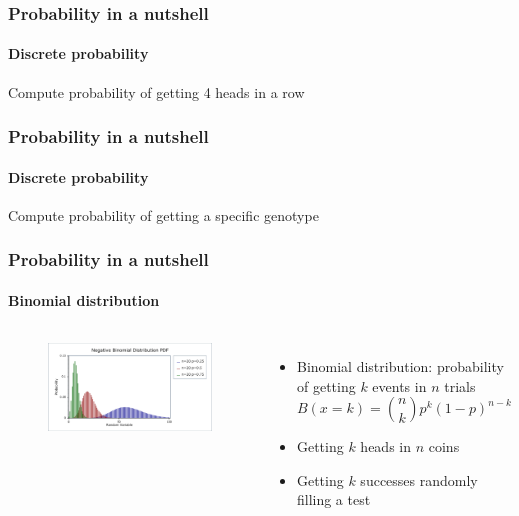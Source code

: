 \documentclass[aspectratio=43]{beamer}
\begin{document}
\begin{frame}

	\frametitle{Probability in a nutshell}
	\framesubtitle{Discrete probability}
	
	\footnotesize
	
	Compute probability of getting 4 heads in a row

\end{frame}

\begin{frame}
	
	\frametitle{Probability in a nutshell}
	\framesubtitle{Discrete probability}
	
	\footnotesize
	
	Compute probability of getting a specific genotype

\end{frame}

\begin{frame}
	
	\frametitle{Probability in a nutshell}
	\framesubtitle{Binomial distribution}
	
	\footnotesize
	
	\begin{columns}	
		
		
		\begin{figure}
			\includegraphics[width = 5 cm]{plots/part1/binomial.png}
		\end{figure}
		
		
		\begin{itemize}
			\item Binomial distribution: probability of getting $k$ events in $n$ trials
			\begin{equation}
				B(x = k) = {n \choose k} p^{k}(1-p)^{n-k} \nonumber
			\end{equation}
			\item Getting $k$ heads in $n$ coins
			\item Getting $k$ successes randomly filling a test
		\end{itemize}
		
	\end{columns}

\end{frame}
\end{document}
